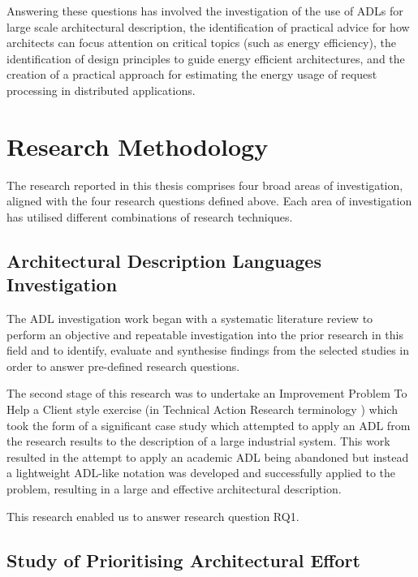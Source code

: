 Answering these questions has involved the investigation of the use of ADLs for large scale architectural description, the identification of practical advice for how architects can focus attention on critical topics (such as energy efficiency), the identification of design principles to guide energy efficient architectures, and the creation of a practical approach for estimating the energy usage of request processing in distributed applications.

\section{Research Methodology}

The research reported in this thesis comprises four broad areas of investigation, aligned with the four research questions defined above.  Each area of investigation has utilised different combinations of research techniques.

\subsection{Architectural Description Languages Investigation}

The ADL investigation work began with a systematic literature review \cite{kitchenham2007-slr} to perform an objective and repeatable investigation into the prior research in this field and to identify, evaluate and synthesise findings from the selected studies in order to answer pre-defined research questions.  

The second stage of this research was to undertake an Improvement Problem To Help a Client style exercise (in Technical Action Research terminology \cite{wieringa2012-tar}) which took the form of a significant case study which attempted to apply an ADL from the research results to the description of a large industrial system.  This work resulted in the attempt to apply an academic ADL being abandoned but instead a lightweight ADL-like notation was developed and successfully applied to the problem, resulting in a large and effective architectural description.

This research enabled us to answer research question RQ1.

\subsection{Study of Prioritising Architectural Effort}

